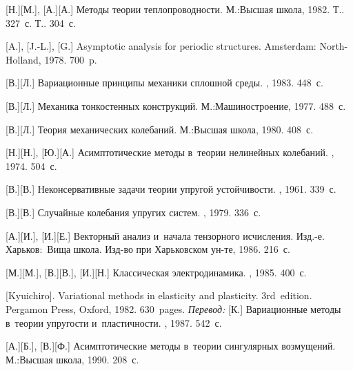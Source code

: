\begin{thebibliography}{123}
\begin{otherlanguage}{russian}
[Н.][М.], [А.][А.] Методы теории теплопроводности. М.:\;Высшая школа, 1982. Т.. 327~с. Т.. 304~с.

[A.], [J.-L.], [G.] Asymptotic analysis for periodic structures. Amsterdam: North\hbox{-}Holland, 1978. 700~p.

[В.][Л.] Вариационные принципы механики сплошной среды. \naukapublisher, 1983. 448~с.

[В.][Л.] Механика тонкостенных конструкций. М.:\;Машино\-строение, 1977. 488~с.

[В.][Л.] Теория механических колебаний. М.:\;Высшая школа, 1980. 408~с.

[Н.][Н.], [Ю.][А.] Асимптотические методы в~теории нелинейных колебаний. \naukapublisher, 1974. 504~с.

[В.][В.] Неконсервативные задачи теории упругой устойчивости. \fizmatgiz, 1961. 339~с.

[В.][В.] Случайные колебания упругих систем. \naukapublisher, 1979. 336~с.

[А.][И.], [И.][Е.] Векторный анализ и~начала тензорного исчисления. Изд.\hbox{-}е. Харьков:~Вища школа. Изд\hbox{-}во при Харь\-ков\-ском ун\hbox{-}те, 1986. 216~с.

[М.][М.], [В.][В.], [И.][Н.] Классическая электродинамика. \naukapublisher, 1985. 400~с.

[Kyuichiro]. Variational methods in elasticity and plasticity. 3rd~edition. Pergamon Press, Oxford, 1982. 630~pages.
\emph{Перевод:} [К.] Вариационные методы в~теории упругости и~пластичности. \mirpublisher, 1987. 542~с.

[А.][Б.], [В.][Ф.] Асимптотические методы в~теории сингулярных возмущений. М.:\;Высшая школа, 1990. 208~с.


\end{otherlanguage}
\end{thebibliography}
